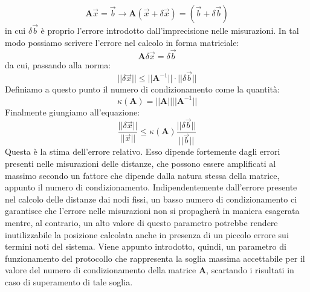 \documentclass[Lau,binding=0.6cm]{sapthesis}
\begin{document}
\begin{equation}
\textbf{A}\overrightarrow{x} = \overrightarrow{b} \rightarrow \textbf{A}(\overrightarrow{x}+\delta\overrightarrow{x}) = (\overrightarrow{b}+\delta\overrightarrow{b})
\end{equation}
\newline
in cui $\delta\overrightarrow{b}$ è proprio l'errore introdotto dall'imprecisione nelle misurazioni.
In tal modo possiamo scrivere l'errore nel calcolo in forma matriciale:\newline
\begin{equation}
\textbf{A}\delta\overrightarrow{x} = \delta\overrightarrow{b}
\end{equation}
\newline
da cui, passando alla norma: \newline
\begin{equation}
||\delta\overrightarrow{x}|| \leq ||\textbf{A}^{-1}|| \cdot ||\delta\overrightarrow{b}||
\end{equation}
Definiamo a questo punto il numero di condizionamento come la quantità: \newline
\begin{equation}
\kappa (\textbf{A}) = ||\textbf{A}|| ||\textbf{A}^{-1}|| 
\end{equation}
\newline
Finalmente giungiamo all'equazione: \newline
\begin{equation}
\frac{||\delta\overrightarrow{x}||}{||\overrightarrow{x}||} \leq  \kappa (\textbf{A}) \frac{||\delta\overrightarrow{b}||}{||\overrightarrow{b}||}
\end{equation}
Questa è la stima dell'errore relativo. Esso dipende fortemente dagli errori presenti nelle misurazioni delle distanze, che possono essere amplificati al massimo secondo un fattore che dipende dalla natura stessa della matrice, appunto il numero di condizionamento. Indipendentemente dall'errore presente nel calcolo delle distanze dai nodi fissi, un basso numero di condizionamento ci garantisce che l'errore nelle misurazioni non si propagherà in maniera esagerata mentre, al contrario, un alto valore di questo parametro potrebbe rendere inutilizzabile la posizione calcolata anche in presenza di un piccolo errore sui termini noti del sistema.\newline
Viene appunto introdotto, quindi, un parametro di funzionamento del protocollo che rappresenta la soglia massima accettabile per il valore del numero di condizionamento della matrice \textbf{A}, scartando i risultati in caso di superamento di tale soglia.
\end{document}
